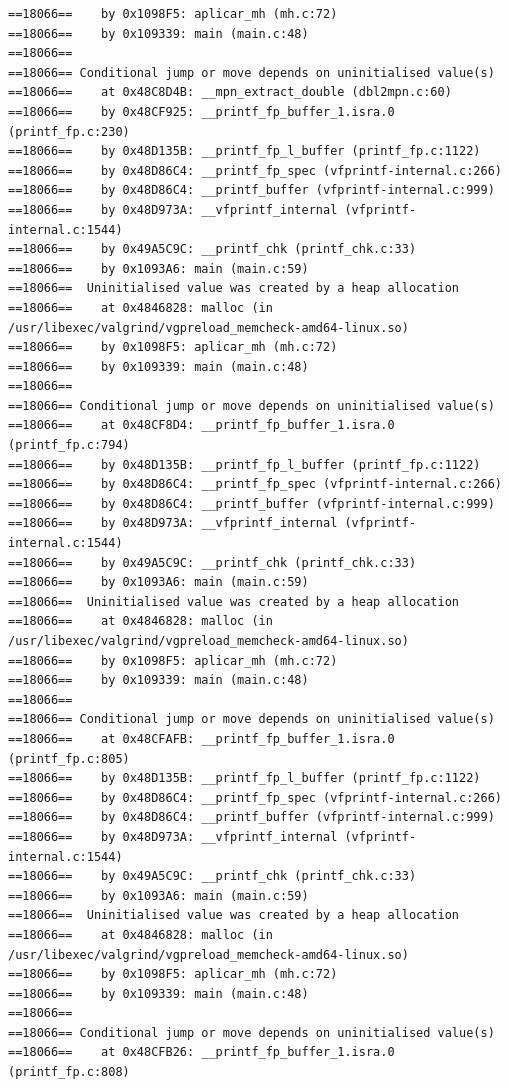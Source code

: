 \documentclass[12pt]{article}
\begin{document}
\begin{lstlisting}[style=EstiloValgrind]
==18066==    by 0x1098F5: aplicar_mh (mh.c:72)
==18066==    by 0x109339: main (main.c:48)
==18066== 
==18066== Conditional jump or move depends on uninitialised value(s)
==18066==    at 0x48C8D4B: __mpn_extract_double (dbl2mpn.c:60)
==18066==    by 0x48CF925: __printf_fp_buffer_1.isra.0 (printf_fp.c:230)
==18066==    by 0x48D135B: __printf_fp_l_buffer (printf_fp.c:1122)
==18066==    by 0x48D86C4: __printf_fp_spec (vfprintf-internal.c:266)
==18066==    by 0x48D86C4: __printf_buffer (vfprintf-internal.c:999)
==18066==    by 0x48D973A: __vfprintf_internal (vfprintf-internal.c:1544)
==18066==    by 0x49A5C9C: __printf_chk (printf_chk.c:33)
==18066==    by 0x1093A6: main (main.c:59)
==18066==  Uninitialised value was created by a heap allocation
==18066==    at 0x4846828: malloc (in /usr/libexec/valgrind/vgpreload_memcheck-amd64-linux.so)
==18066==    by 0x1098F5: aplicar_mh (mh.c:72)
==18066==    by 0x109339: main (main.c:48)
==18066== 
==18066== Conditional jump or move depends on uninitialised value(s)
==18066==    at 0x48CF8D4: __printf_fp_buffer_1.isra.0 (printf_fp.c:794)
==18066==    by 0x48D135B: __printf_fp_l_buffer (printf_fp.c:1122)
==18066==    by 0x48D86C4: __printf_fp_spec (vfprintf-internal.c:266)
==18066==    by 0x48D86C4: __printf_buffer (vfprintf-internal.c:999)
==18066==    by 0x48D973A: __vfprintf_internal (vfprintf-internal.c:1544)
==18066==    by 0x49A5C9C: __printf_chk (printf_chk.c:33)
==18066==    by 0x1093A6: main (main.c:59)
==18066==  Uninitialised value was created by a heap allocation
==18066==    at 0x4846828: malloc (in /usr/libexec/valgrind/vgpreload_memcheck-amd64-linux.so)
==18066==    by 0x1098F5: aplicar_mh (mh.c:72)
==18066==    by 0x109339: main (main.c:48)
==18066== 
==18066== Conditional jump or move depends on uninitialised value(s)
==18066==    at 0x48CFAFB: __printf_fp_buffer_1.isra.0 (printf_fp.c:805)
==18066==    by 0x48D135B: __printf_fp_l_buffer (printf_fp.c:1122)
==18066==    by 0x48D86C4: __printf_fp_spec (vfprintf-internal.c:266)
==18066==    by 0x48D86C4: __printf_buffer (vfprintf-internal.c:999)
==18066==    by 0x48D973A: __vfprintf_internal (vfprintf-internal.c:1544)
==18066==    by 0x49A5C9C: __printf_chk (printf_chk.c:33)
==18066==    by 0x1093A6: main (main.c:59)
==18066==  Uninitialised value was created by a heap allocation
==18066==    at 0x4846828: malloc (in /usr/libexec/valgrind/vgpreload_memcheck-amd64-linux.so)
==18066==    by 0x1098F5: aplicar_mh (mh.c:72)
==18066==    by 0x109339: main (main.c:48)
==18066== 
==18066== Conditional jump or move depends on uninitialised value(s)
==18066==    at 0x48CFB26: __printf_fp_buffer_1.isra.0 (printf_fp.c:808)

\end{lstlisting}
\end{document}
